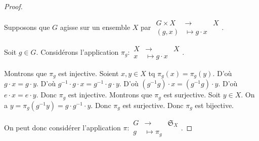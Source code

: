 \documentclass[french]{book}
\begin{document}
\begin{proof}

  \









  Supposons que $G$ agisse sur un ensemble $X$ par $
    \begin{array}{rcl}
    G \times X & \longrightarrow & X \\
    (g,x) & \longmapsto g \cdot x
    \end{array}$.

  Soit $g \in G$. Considérons l'application $\pi_g:
    \begin{array}{rcl}
    X & \longrightarrow & X \\
    x & \longmapsto g \cdot x
    \end{array}$.

  Montrons que $\pi_g$ est injective. Soient $x, y \in X$ tq $\pi_g(x) = \pi_g(y)$. D'où $g \cdot x = g \cdot y$. D'où $g ^{-1}  \cdot g \cdot x = g ^{-1}  \cdot g \cdot y$. D'où $(g ^{-1}  g ) \cdot x = (g ^{-1}  g ) \cdot y$. D'où $e \cdot x = e \cdot y$. Donc $\pi_g$ est injective. Montrons que $\pi_g$ est surjective. Soit $y \in X$. On a $y = \pi_g(g ^{-1}  y) = g \cdot g ^{-1}  \cdot y$. Donc $\pi_g$ est surjective. Donc $\pi_g$ est bijective.

  On peut donc considérer l'application $\pi:
    \begin{array}{rcl}
    G & \longrightarrow & \mathfrak{S}_{X}  \\
    g & \longmapsto \pi_g
    \end{array}$.


\end{proof}
\end{document}
